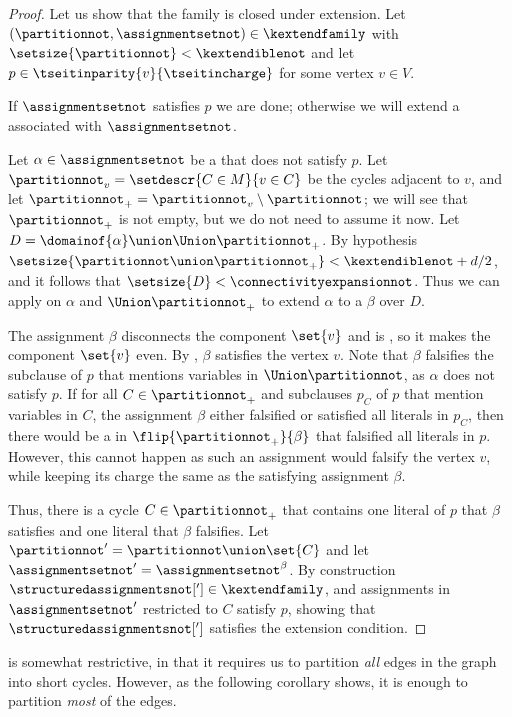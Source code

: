 \documentclass[11pt]{article}
\numberwithin{equation}{section}
\theoremstyle{definition}
\theoremstyle{plain}
\begin{document}
\begin{proof}
  Let us show that the family is closed under extension. Let $(\partitionnot,\assignmentsetnot)\in\kextendfamily$ with $\setsize{\partitionnot} < \kextendiblenot$ and let $p\in\tseitinparity{v}{\tseitincharge}$ for some vertex $v\in V$.

  If $\assignmentsetnot$ satisfies $p$ we are done; otherwise we will extend a \nonsplittingassignment associated with $\assignmentsetnot$.

  Let $\alpha\in\assignmentsetnot$ be a \nonsplittingassignment that does not satisfy $p$. Let $\partitionnot_v=\setdescr{C\in M}{v\in C}$ be the cycles adjacent to $v$, and let $\partitionnot_+=\partitionnot_v\setminus\partitionnot$; we will see that $\partitionnot_+$ is not empty, but we do not need to assume it now. Let $D=\domainof{\alpha}\union\Union\partitionnot_+$. By hypothesis $\setsize{\partitionnot\union\partitionnot_+} < \kextendiblenot + d/2$, and it follows that $\setsize{D} < \connectivityexpansionnot$. Thus we can apply  on $\alpha$ and $\Union\partitionnot_+$ to extend $\alpha$ to a \nonsplittingassignment $\beta$ over $D$.

The assignment $\beta$ disconnects the component $\set{v}$ and is \nonsplitting, so it makes the component $\set{v}$ even. By , $\beta$ satisfies the vertex $v$. Note that $\beta$ falsifies the subclause of $p$ that mentions variables in $\Union\partitionnot$, as $\alpha$ does not satisfy $p$. If for all $C\in\partitionnot_+$ and subclauses $p_C$ of $p$ that mention variables in $C$, the assignment $\beta$ either falsified or satisfied all literals in $p_C$, then there would be a \nonsplittingassignment in $\flip{\partitionnot_+}{\beta}$ that falsified all literals in $p$. However, this cannot happen as such an assignment would falsify the vertex $v$, while keeping its charge the same as the satisfying assignment $\beta$.

Thus, there is a cycle $C\in\partitionnot_+$ that contains one literal of $p$ that $\beta$ satisfies and one literal that $\beta$ falsifies. Let $\partitionnot'=\partitionnot\union\set{C}$ and let $\assignmentsetnot'=\assignmentsetnot^\beta$. By construction $\structuredassignmentsnot['] \in \kextendfamily$, and assignments in $\assignmentsetnot'$ restricted to $C$ satisfy $p$, showing that $\structuredassignmentsnot[']$ satisfies the extension condition.
\end{proof}


 is somewhat restrictive, in that it requires us to partition \emph{all} edges in the graph into short cycles. However, as the following corollary shows, it is enough to partition \emph{most} of the edges.
\end{document}
